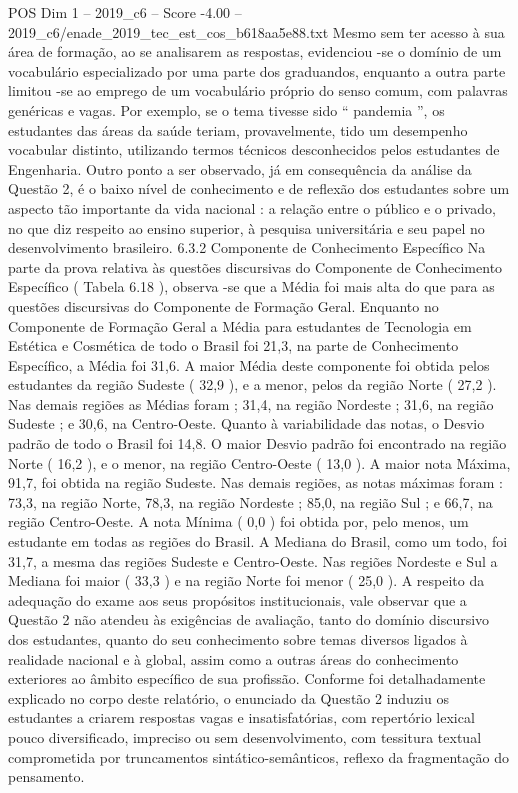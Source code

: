 \begin{textsample}{POS Dim 1 – 2019\_c6 – Score -4.00 – 2019\_c6/enade\_2019\_tec\_est\_cos\_b618aa5e88.txt}
Mesmo sem ter acesso à sua área de formação, ao se analisarem as respostas, evidenciou -se o domínio de um vocabulário especializado por uma parte dos graduandos, enquanto a outra parte limitou -se ao emprego de um vocabulário próprio do senso comum, com palavras genéricas e vagas.
Por exemplo, se o tema tivesse sido “ pandemia ”, os estudantes das áreas da saúde teriam, provavelmente, tido um desempenho vocabular distinto, utilizando termos técnicos desconhecidos pelos estudantes de Engenharia.
Outro ponto a ser observado, já em consequência da análise da Questão 2, é o baixo nível de conhecimento e de reflexão dos estudantes sobre um aspecto tão importante da vida nacional : a relação entre o público e o privado, no que diz respeito ao ensino superior, à pesquisa universitária e seu papel no desenvolvimento brasileiro. 6.3.2 Componente de Conhecimento Específico Na parte da prova relativa às questões discursivas do Componente de Conhecimento Específico ( Tabela 6.18 ), observa -se que a Média foi mais alta do que para as questões discursivas do Componente de Formação Geral.
Enquanto no Componente de Formação Geral a Média para estudantes de Tecnologia em Estética e Cosmética de todo o Brasil foi 21,3, na parte de Conhecimento Específico, a Média foi 31,6.
A maior Média deste componente foi obtida pelos estudantes da região Sudeste ( 32,9 ), e a menor, pelos da região Norte ( 27,2 ).
Nas demais regiões as Médias foram ; 31,4, na região Nordeste ; 31,6, na região Sudeste ; e 30,6, na Centro-Oeste.
Quanto à variabilidade das notas, o Desvio padrão de todo o Brasil foi 14,8.
O maior Desvio padrão foi encontrado na região Norte ( 16,2 ), e o menor, na região Centro-Oeste ( 13,0 ).
A maior nota Máxima, 91,7, foi obtida na região Sudeste.
Nas demais regiões, as notas máximas foram : 73,3, na região Norte, 78,3, na região Nordeste ; 85,0, na região Sul ; e 66,7, na região Centro-Oeste.
A nota Mínima ( 0,0 ) foi obtida por, pelo menos, um estudante em todas as regiões do Brasil.
A Mediana do Brasil, como um todo, foi 31,7, a mesma das regiões Sudeste e Centro-Oeste.
Nas regiões Nordeste e Sul a Mediana foi maior ( 33,3 ) e na região Norte foi menor ( 25,0 ).
A respeito da adequação do exame aos seus propósitos institucionais, vale observar que a Questão 2 não atendeu às exigências de avaliação, tanto do domínio discursivo dos estudantes, quanto do seu conhecimento sobre temas diversos ligados à realidade nacional e à global, assim como a outras áreas do conhecimento exteriores ao âmbito específico de sua profissão.
Conforme foi detalhadamente explicado no corpo deste relatório, o enunciado da Questão 2 induziu os estudantes a criarem respostas vagas e insatisfatórias, com repertório lexical pouco diversificado, impreciso ou sem desenvolvimento, com tessitura textual comprometida por truncamentos sintático-semânticos, reflexo da fragmentação do pensamento.

\end{textsample}
